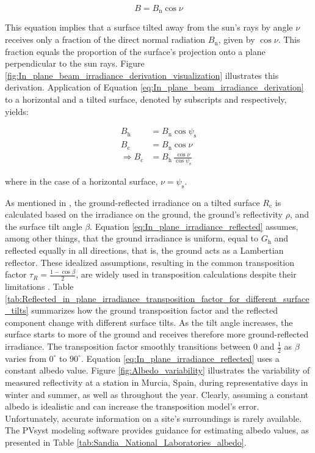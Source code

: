 \begin{equation}
    B = B_{\text{n}} \cos \nu
    \label{eq:In_plane_beam_irradiance_derivation}
\end{equation}

\noindent
This equation implies that a surface tilted away from the sun's rays by angle \(\nu\)
receives only a fraction of the direct normal radiation \(B_{\text{n}}\), given by \(\cos \nu\).
This fraction equals the proportion of the surface's projection onto a plane perpendicular
to the sun rays. Figure \ref{fig:In_plane_beam_irradiance_derivation_visualization}
illustrates this derivation. Application of Equation \ref{eq:In_plane_beam_irradiance_derivation}
to a horizontal and a tilted surface, denoted by subscripts  and  respectively,
yields:

\begin{align}
    B_{\text{h}} &= B_{\text{n}} \cos \psi_{\text{s}} \\[7pt]
    B_{\text{c}} &= B_{\text{n}} \cos \nu \\[4pt]
    \Rightarrow B_{\text{c}} &= B_{\text{h}} \, \frac{\cos \nu}{\cos \psi_{\text{s}}}
\end{align}

\noindent
where in the case of a horizontal surface, \(\nu = \psi_{\text{s}}\).

As mentioned in \cite{SandiaNationalLaboratory}, the ground-reflected irradiance on a tilted
surface \(R_{\text{c}}\) is calculated based on the irradiance on the ground, the ground's reflectivity
\(\rho\), and the surface tilt angle \(\beta\). Equation \ref{eq:In_plane_irradiance_reflected} assumes,
among other things, that the ground irradiance is uniform, equal to \(G_{\text{h}}\) and reflected equally
in all directions, that is, the ground acts as a Lambertian reflector. These idealized assumptions,
resulting in the common transposition factor \(\tau_{R} = \frac{1 - \cos \beta}{2}\), are widely used
in transposition calculations despite their limitations \cite{Gueymard2017, Quan2020}. Table
\ref{tab:Reflected_in_plane_irradiance_transposition_factor_for_different_surface_tilts}
summarizes how the ground transposition factor and the reflected component change with different surface tilts.
As the tilt angle increases, the surface starts to  more of the ground and receives therefore more
ground-reflected irradiance. The transposition factor smoothly transitions between 0 and \(\frac{1}{2}\)
as \(\beta\) varies from \(0^\circ\) to \(90^\circ\). Equation \ref{eq:In_plane_irradiance_reflected}
uses a constant albedo value. Figure \ref{fig:Albedo_variability} illustrates the variability of
measured reflectivity at a station in Murcia, Spain, during representative days in winter and summer, as well as throughout the year.
Clearly, assuming a constant albedo is idealistic and can increase the transposition model's error.
Unfortunately, accurate information on a site's surroundings is rarely available. The PVsyst
modeling software provides guidance for estimating albedo values, as presented in Table
\ref{tab:Sandia_National_Laboratories_albedo}.


